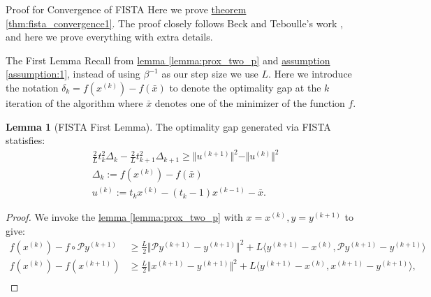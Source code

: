 \documentclass[]{article}
\theoremstyle{definition}
\newtheorem{lemma}{Lemma}[subsection]  %
\begin{document}
\appendix
\begin{section}{Proof for Convergence of FISTA}\label{sec:fista1_proof}
    Here we prove \hyperref[thm:fista_convergence1]{theorem \ref*{thm:fista_convergence1}}. The proof closely follows Beck and Teboulle's work \cite{paper:FISTA}, and here we prove everything with extra details. 
    \begin{subsection}{The First Lemma}
        Recall from \hyperref[lemma:prox_two_p]{lemma \ref*{lemma:prox_two_p}}
        and \hyperref[assumption:1]{assumption \ref*{assumption:1}}, instead of using $\beta^{-1}$ as our step size we use $L$. Here we introduce the notation $\delta_k = f(x^{(k)}) - f(\bar x)$ to denote the optimality gap at the $k$ iteration of the algorithm where $\bar x$ denotes one of the minimizer of the function $f$. 
        \begin{lemma}[FISTA First Lemma]\label{lemma:fista_first_lemma}
            The optimality gap generated via FISTA statisfies: 
            \begin{align*}
                & 
                \frac{2}{L}t^2_k \Delta_k - \frac{2}{L}t^2_{k + 1} \Delta_{k + 1} 
                \ge 
                \Vert u^{(k + 1)}\Vert^2 - \Vert u^{(k)}\Vert^2
                \\
                & \Delta_k := f(x^{(k)}) - f(\bar x)
                \\
                & u^{(k)} := t_k x^{(k)} - (t_k - 1)x^{(k - 1)} - \bar x.
            \end{align*}
        \end{lemma}
        \begin{proof}
            We invoke the \hyperref[lemma:prox_two_p]{lemma \ref*{lemma:prox_two_p}} with $x = x^{(k)}, y = y^{(k +1)}$ to give: 
            \begin{align*}\label{lemma:fista_first_lemma_1}
                f(x^{(k)}) - f\circ \mathcal P y^{(k + 1)}
                & \ge 
                \frac{L}{2}\Vert \mathcal Py^{(k + 1)} - y^{(k + 1)}\Vert^2 + 
                L \langle y^{(k + 1)} - x^{(k)}, 
                    \mathcal Py^{(k + 1)} - y^{(k + 1)}
                \rangle
                \\
                f(x^{(k)}) - f(x^{(k + 1)}) 
                & \ge 
                \frac{L}{2}\Vert x^{(k + 1)} - y^{(k + 1)}\Vert^2 + 
                L 
                \langle 
                    y^{(k + 1)} - x^{(k)}, 
                    x^{(k + 1)} - y^{(k + 1)}
                \rangle, 
                \\

\end{align*}
\end{proof}
\end{subsection}
\end{section}
\end{document}
